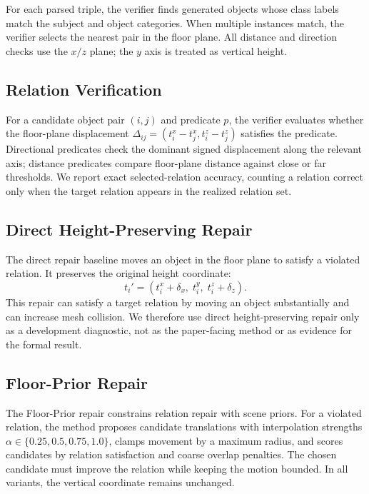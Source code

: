 \documentclass{article}
\newcommand{\fp}{Floor-Prior}
\begin{document}
For each parsed triple, the verifier finds generated objects whose class labels match the subject and object categories. When multiple instances match, the verifier selects the nearest pair in the floor plane. All distance and direction checks use the $x/z$ plane; the $y$ axis is treated as vertical height.

\subsection{Relation Verification}

For a candidate object pair $(i,j)$ and predicate $p$, the verifier evaluates whether the floor-plane displacement $\Delta_{ij}=(t_i^x-t_j^x, t_i^z-t_j^z)$ satisfies the predicate. Directional predicates check the dominant signed displacement along the relevant axis; distance predicates compare floor-plane distance against close or far thresholds. We report exact selected-relation accuracy, counting a relation correct only when the target relation appears in the realized relation set.

\subsection{Direct Height-Preserving Repair}

The direct repair baseline moves an object in the floor plane to satisfy a violated relation. It preserves the original height coordinate:
\[
  t_i' = (t_i^x + \delta_x, \; t_i^y, \; t_i^z + \delta_z).
\]
This repair can satisfy a target relation by moving an object substantially and can increase mesh collision. We therefore use direct height-preserving repair only as a development diagnostic, not as the paper-facing method or as evidence for the formal result.

\subsection{Floor-Prior Repair}

The \fp{} repair constrains relation repair with scene priors. For a violated relation, the method proposes candidate translations with interpolation strengths $\alpha \in \{0.25,0.5,0.75,1.0\}$, clamps movement by a maximum radius, and scores candidates by relation satisfaction and coarse overlap penalties. The chosen candidate must improve the relation while keeping the motion bounded. In all variants, the vertical coordinate remains unchanged.
\end{document}
